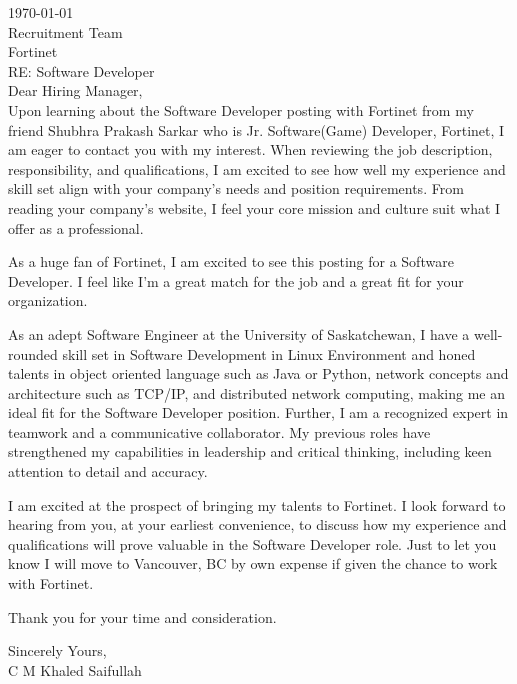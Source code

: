 \documentclass[10pt,a4paper,ragged2e,withhyper]{altacv}
\begin{document}

\makecvheader

\hfill \break
\hfill \break

\today\\
\hfill \break
Recruitment Team\\
Fortinet\\
\hfil \break
RE: Software Developer\\
\hfil \break
Dear Hiring Manager,\\
\hfill\break
Upon learning about the Software Developer posting with Fortinet from my friend Shubhra Prakash Sarkar who is Jr. Software(Game) Developer, Fortinet, I am eager to contact you with my interest. When reviewing the job description, responsibility, and qualifications, I am excited to see how well my experience and skill set align with your company's needs and position requirements. From reading your company's website, I feel your core mission and culture suit what I offer as a professional.\\
\hfill \break

As a huge fan of Fortinet, I am excited to see this posting for a Software Developer. I feel like I'm a great match for the job and a great fit for your organization.\\
\hfill \break

As an adept Software Engineer at the University of Saskatchewan, I have a well-rounded skill set in Software Development in Linux Environment and honed talents in object oriented language such as Java or Python, network concepts and architecture such as TCP/IP, and distributed network computing, making me an ideal fit for the Software Developer position. Further, I am a recognized expert in teamwork and a communicative collaborator. My previous roles have strengthened my capabilities in leadership and critical thinking, including keen attention to detail and accuracy.\\
\hfill \break

I am excited at the prospect of bringing my talents to Fortinet. I look forward to hearing from you, at your earliest convenience, to discuss how my experience and qualifications will prove valuable in the Software Developer role. Just to let you know I will move to Vancouver, BC by own expense if given the chance to work with Fortinet.\\
\hfill \break

Thank you for your time and consideration.\\
\hfill \break

\hfill \break
\hfill \break
Sincerely Yours,\\
C M Khaled Saifullah
\end{document}
